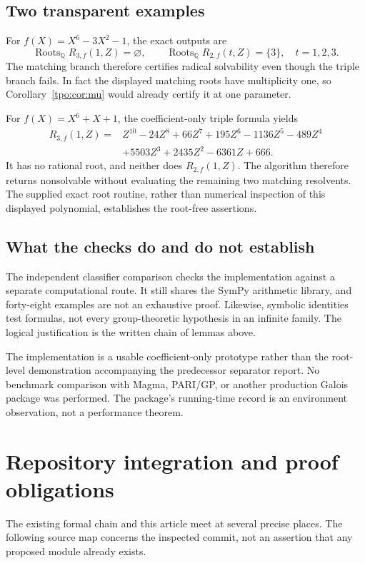 \documentclass[11pt,letterpaper]{article}
\numberwithin{equation}{section}
\theoremstyle{definition}
\theoremstyle{remark}
\newcommand{\QQ}{\mathbb Q}
\newcommand{\Rtwo}{R_{2,f}}
\newcommand{\Rthree}{R_{3,f}}
\begin{document}
\subsection{Two transparent examples}
For $f(X)=X^6-3X^2-1$, the exact outputs are
\[
 \operatorname{Roots}_{\QQ}\Rthree(1,Z)=\varnothing,
 \qquad
 \operatorname{Roots}_{\QQ}\Rtwo(t,Z)=\{3\},\quad t=1,2,3.
\]
The matching branch therefore certifies radical solvability even though the
triple branch fails. In fact the displayed matching roots have multiplicity
one, so Corollary~\ref{tpo:cor:mu} would already certify it at one parameter.

For $f(X)=X^6+X+1$, the coefficient-only triple formula yields
\begin{align*}
 \Rthree(1,Z)={}&Z^{10}-24Z^8+66Z^7+195Z^6-1136Z^5-489Z^4\\
 &+5503Z^3+2435Z^2-6361Z+666.
\end{align*}
It has no rational root, and neither does $\Rtwo(1,Z)$. The algorithm
therefore returns nonsolvable without evaluating the remaining two matching
resolvents. The supplied exact root routine, rather than numerical inspection
of this displayed polynomial, establishes the root-free assertions.

\subsection{What the checks do and do not establish}
The independent classifier comparison checks the implementation against a
separate computational route. It still shares the SymPy arithmetic library,
and forty-eight examples are not an exhaustive proof. Likewise, symbolic
identities test formulas, not every group-theoretic hypothesis in an infinite
family. The logical justification is the written chain of lemmas above.

The implementation is a usable coefficient-only prototype rather than the
root-level demonstration accompanying the predecessor separator report. No
benchmark comparison with Magma, PARI/GP, or another production Galois package
was performed. The package's running-time record is an environment observation,
not a performance theorem.

\section{Repository integration and proof obligations}
\label{tpo:sec:integration}

The existing formal chain and this article meet at several precise places.
The following source map concerns the inspected commit, not an assertion that
any proposed module already exists.
\end{document}
